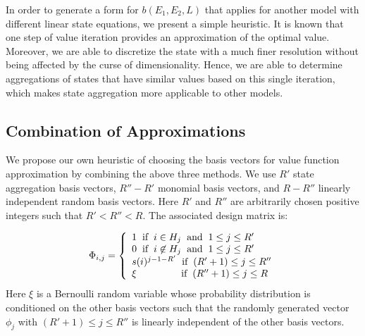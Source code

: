 \documentclass[conference]{IEEEtran}
\begin{document}
	In order to generate a form for $b(E_{1},E_{2},L)$ that applies for another model with different linear state equations, we present a simple heuristic. It is known that one step of value iteration provides an approximation of the optimal value. Moreover, we are able to discretize the state with a much finer resolution without being affected by the curse of dimensionality. Hence, we are able to determine aggregations of states that have similar values based on this single iteration, which makes state aggregation more applicable to other models.
    

\subsection{Combination of Approximations}
    
    We propose our own heuristic of choosing the basis vectors for value function approximation by combining the above three methods. We use $R'$ state aggregation basis vectors, $R''-R'$ monomial basis vectors, and $R-R''$ linearly independent random basis vectors. Here $R'$ and $R''$ are arbitrarily chosen positive integers such that $R'<R''<R$. The associated design matrix is:
    
    \begin{displaymath}
        \Phi_{i,j}=\left\{
            \begin{array}{l}
            1 \hspace{0.2cm} \text{if} \hspace{0.2cm} i\in H_{j} \hspace{0.2cm} \text{and} \hspace{0.2cm} 1\leq j\leq R'\\
            0 \hspace{0.2cm} \text{if} \hspace{0.2cm} i\not\in H_{j} \hspace{0.2cm} \text{and} \hspace{0.2cm} 1\leq j\leq R'\\
            s(i)^{j-1-R'} \hspace{0.2cm} \text{if} \hspace{0.2cm} (R'+1)\leq j\leq R''\\
            \xi \hspace{1.6cm} \text{if} \hspace{0.2cm} (R''+1)\leq j\leq R
            \end{array}
            \right.
    \end{displaymath} Here $\xi$ is a Bernoulli random variable whose probability distribution is conditioned on the other basis vectors such that the randomly generated vector $\phi_{j}$ with $(R'+1)\leq j\leq R''$ is linearly independent of the other basis vectors.
    
\end{document}
